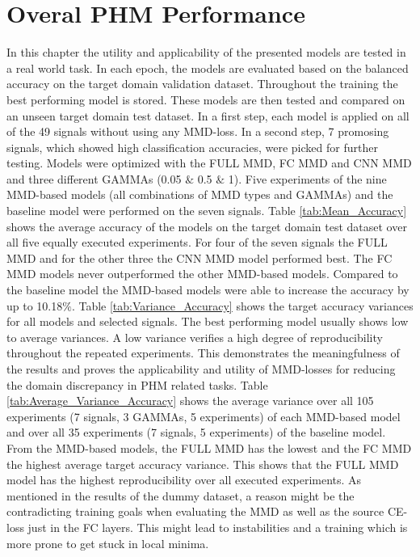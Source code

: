 \section{Overal PHM Performance}\label{ch:PHM_performance}
In this chapter the utility and applicability of the presented models are tested in a real world task. In each epoch, the models are evaluated based on the balanced accuracy on the target domain validation dataset. Throughout the training the best performing model is stored. These models are then tested and compared on an unseen target domain test dataset. In a first step, each model is applied on all of the 49 signals without using any MMD-loss. In a second step, 7 promosing signals, which showed high classification accuracies, were picked for further testing. Models were optimized with the FULL MMD, FC MMD and CNN MMD and three different GAMMAs (0.05 $\&$ 0.5 $\&$ 1). Five experiments of the nine MMD-based models (all combinations of MMD types and GAMMAs) and the baseline model were performed on the seven signals. Table \ref{tab:Mean_Accuracy} shows the average accuracy of the models on the target domain test dataset over all five equally executed experiments. For four of the seven signals the FULL MMD and for the other three the CNN MMD model performed best. The FC MMD models never outperformed the other MMD-based models. Compared to the baseline model the MMD-based models were able to increase the accuracy by up to 10.18$\%$. Table \ref{tab:Variance_Accuracy} shows the target accuracy variances for all models and selected signals. The best performing model usually shows low to average variances. A low variance verifies a high degree of reproducibility throughout the repeated experiments. This demonstrates the meaningfulness of the results and proves the applicability and utility of MMD-losses for reducing the domain discrepancy in PHM related tasks. Table \ref{tab:Average_Variance_Accuracy} shows the average variance over all 105 experiments (7 signals, 3 GAMMAs, 5 experiments) of each MMD-based model and over all 35 experiments (7 signals, 5 experiments) of the baseline model. From the MMD-based models, the FULL MMD has the lowest and the FC MMD the highest average target accuracy variance. This shows that the FULL MMD model has the highest reproducibility over all executed experiments. As mentioned in the results of the dummy dataset, a reason might be the contradicting training goals when evaluating the MMD as well as the source CE-loss just in the FC layers. This might lead to instabilities and a training which is more prone to get stuck in local minima.

